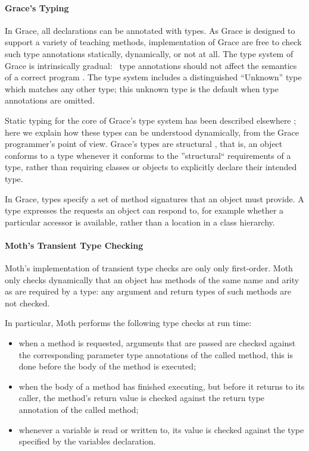 \documentclass[sigplan,10pt,review,screen]{acmart}\settopmatter{printfolios=true}
\begin{document}
\paragraph{Grace's Typing}
In Grace, all declarations can be annotated with types.
As Grace is designed to support a variety of teaching methods, implementation of Grace are free to check such type annotations  statically, dynamically, or not at all.
The type system of Grace is intrinsically gradual:%
%
~type annotations should not affect the semantics of a correct
program \citep{XXXSiek2015}. The type system
includes a distinguished ``{Unknown}'' type which matches any other type; this unknown type is the default when type annotations are omitted.

Static typing for the core of Grace's type system has been described
elsewhere \citep{TimJonesThesis};
here we explain how
these types can be understood 
dynamically, from the Grace programmer's point of view.
Grace's types are structural \citep{graceOnward12},
that is, an object conforms to a type whenever it conforms to the ''structural`` requirements of a type,
rather than requiring classes or objects to explicitly declare their intended type.

In Grace, types specify a set of method signatures that an object must provide. A type expresses the requests an object can respond to, for example whether a particular accessor is available, rather than a location in a class hierarchy.

\paragraph{Moth's Transient Type Checking}
Moth's implementation of transient type checks are only only first-order.
Moth only checks dynamically that an object has methods of the same name and arity as are required by a type:  any argument and return types of such methods are not checked.

In particular, Moth performs the following type checks at run time:
\begin{itemize}
\item when a method is requested, arguments that are passed are checked against the corresponding parameter type annotations of the called method, this is done before the body of the method is executed;
\item when the body of a method has finished executing, but before it returns to its caller, the method's return value is checked against the return type annotation of the called method;
\item whenever a variable is read or written to, its value is checked against the type specified by the variables declaration.
\end{itemize}
\end{document}
